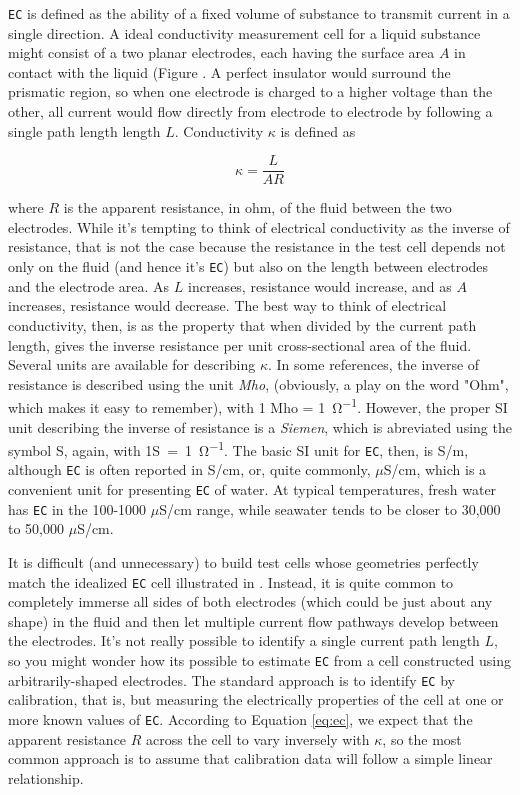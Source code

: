 \texttt{EC} is defined as the ability of a fixed volume of substance to transmit current in a single direction. A ideal conductivity measurement cell for a liquid substance might consist of a two planar electrodes, each having the surface area $A$ in contact with the liquid (Figure . A perfect insulator would surround the prismatic region, so when one electrode is charged to a higher voltage than the other, all current would flow directly from electrode to electrode by following a single path length length $L$.  Conductivity $\kappa$ is defined as 

\begin{equation}\label{eq:ec}
	\kappa= \frac{L}{AR}
\end{equation}

where $R$ is the apparent resistance, in \si{ohm}, of the fluid between the two electrodes. While it's tempting to think of electrical conductivity as the inverse of resistance, that is not the case because the resistance in the test cell depends not only on the fluid (and hence it's \texttt{EC}) but also on the length between electrodes and the electrode area.  As $L$ increases, resistance would increase, and as $A$ increases, resistance would decrease. The best way to think of electrical conductivity, then, is as the property that when divided by the current path length, gives the inverse resistance per unit cross-sectional area of the fluid.  Several units are available for describing $\kappa$. In some references, the inverse of resistance is described using the unit \emph{Mho}, (obviously, a play on the word "Ohm", which makes it easy to remember), with 1 Mho = \si{1 \ohm^{-1}}.  However, the proper SI unit describing the inverse of resistance is a \emph{Siemen}, which is abreviated using the symbol S, again, with \si{1S = 1 \ohm^{-1}}. The basic SI unit for \texttt{EC}, then, is S/m, although \texttt{EC} is often reported in S/cm, or, quite commonly, $\mu$S/cm, which is a convenient unit for presenting \texttt{EC} of water. At typical temperatures, fresh water has \texttt{EC} in the 100-1000 $\mu$S/cm range, while seawater tends to be closer to 30,000 to 50,000 $\mu$S/cm.

It is difficult (and unnecessary) to build test cells whose geometries perfectly match the idealized \texttt{EC} cell illustrated in . Instead, it is quite common to completely immerse all sides of both electrodes (which could be just about any shape) in the fluid and then let multiple current flow pathways develop between the electrodes. It's not really possible to identify a single current path length $L$, so you might wonder how its possible to estimate \texttt{EC} from a cell constructed using arbitrarily-shaped electrodes. The standard approach is to identify \texttt{EC} by calibration, that is, but measuring the electrically properties of the cell at one or more known values of \texttt{EC}.  According to Equation \ref{eq:ec}, we expect that the apparent resistance $R$ across the cell to vary inversely with $\kappa$, so the most common approach is to assume that calibration data will follow a simple linear relationship. 

